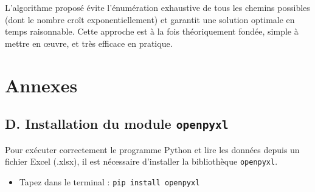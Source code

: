 \documentclass[a4paper,11pt]{article}
\begin{document}
L’algorithme proposé évite l’énumération exhaustive de tous les chemins possibles (dont le nombre croît exponentiellement) et garantit une solution optimale en temps raisonnable.  
Cette approche est à la fois théoriquement fondée, simple à mettre en œuvre, et très efficace en pratique.


\section*{Annexes}

\subsection*{D. Installation du module \texttt{openpyxl}}

Pour exécuter correctement le programme Python et lire les données depuis un fichier Excel (.xlsx), il est nécessaire d’installer la bibliothèque \texttt{openpyxl}.

\begin{itemize}
    \item Tapez dans le terminal : \texttt{pip install openpyxl}
\end{itemize}
\end{document}
